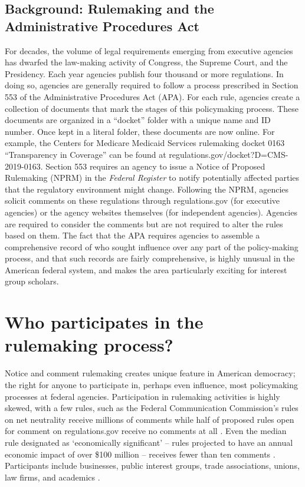 \documentclass[12pt,notitlepage]{article}
\newcounter{cor}
\begin{document}
\hypertarget{background-rulemaking-and-the-administrative-procedures-act}{%
\subsection*{Background: Rulemaking and the Administrative Procedures
Act}\label{background-rulemaking-and-the-administrative-procedures-act}}

For decades, the volume of legal requirements emerging from executive
agencies has dwarfed the law-making activity of Congress, the Supreme
Court, and the Presidency. Each year agencies publish four thousand or
more regulations. In doing so, agencies are generally required to follow
a process prescribed in Section 553 of the Administrative Procedures Act
(APA). For each rule, agencies create a collection of documents that
mark the stages of this policymaking process. These documents are
organized in a ``docket'' folder with a unique name and ID number. Once
kept in a literal folder, these documents are now online. For example,
the Centers for Medicare Medicaid Services rulemaking docket 0163
``Transparency in Coverage'' can be found at
regulations.gov/docket?D=CMS-2019-0163. Section 553 requires an agency
to issue a Notice of Proposed Rulemaking (NPRM) in the \emph{Federal
Register} to notify potentially affected parties that the regulatory
environment might change. Following the NPRM, agencies solicit comments
on these regulations through regulations.gov (for executive agencies) or
the agency websites themselves (for independent agencies). Agencies are
required to consider the comments but are not required to alter the
rules based on them. The fact that the APA requires agencies to assemble
a comprehensive record of who sought influence over any part of the
policy-making process, and that such records are fairly comprehensive,
is highly unusual in the American federal system, and makes the area
particularly exciting for interest group scholars.

\hypertarget{who-participates-in-the-rulemaking-process}{%
\section{Who participates in the rulemaking
process?}\label{who-participates-in-the-rulemaking-process}}

Notice and comment rulemaking creates unique feature in American
democracy; the right for anyone to participate in, perhaps even
influence, most policymaking processes at federal agencies.
Participation in rulemaking activities is highly skewed, with a few
rules, such as the Federal Communication Commission's rules on net
neutrality receive millions of comments while half of proposed rules
open for comment on regulations.gov receive no comments at all
\citep{Libgober_JOP}. Even the median rule designated as `economically
significant' -- rules projected to have an annual economic impact of
over \$100 million -- receives fewer than ten comments
\citep{judgelord2019SPSA}. Participants include businesses, public
interest groups, trade associations, unions, law firms, and academics
\citep{Cuellar_ALR_2005, Yackee_JOP_2006}.
\end{document}
